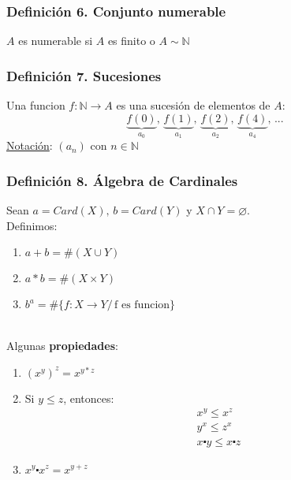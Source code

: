 \documentclass{article}
\newcommand{\comma}{,\,}                                %
\newcommand{\tq}{/\,}                                   %
\newcommand{\naturales}{\mathbb{N}}                     %
\begin{document}
\subsubsection*{Definición 6. Conjunto numerable}
$A$ es numerable si $A$ es finito o $A \sim \naturales$

\subsubsection*{Definición 7. Sucesiones}
Una funcion $f: \naturales \rightarrow A $ es una sucesión de elementos de $A$:
\begin{equation*}
    \underbrace{f(0)}_{a_0}\comma \underbrace{f(1)}_{a_1}\comma \underbrace{f(2)}_{a_2}\comma \underbrace{f(4)}_{a_4}\comma ... 
\end{equation*}
\underline{Notación}: $(a_n)$ con $n \in \naturales$

\subsubsection*{Definición 8. Álgebra de Cardinales}
Sean $a=Card(X)\comma b=Card(Y)$ y $X \cap Y = \varnothing$.
\\Definimos:
\begin{enumerate}
    \item $a + b = \#(X \cup Y)$
    \item $a * b = \#(X \times Y)$
    \item $b^a = \#\{f: X \rightarrow Y \tq \text{f es funcion}\}$
\end{enumerate}
\leavevmode\\Algunas \textbf{propiedades}:
\begin{enumerate}
    \item $(x^y)^z = x^{y*z}$
    \item Si $y \leq z$, entonces:
    \begin{align*}
        &x^y \leq x^z \\
        &y^x \leq z^x \\
        &x \centerdot y \leq x \centerdot z
    \end{align*}
    \item $x^y \centerdot x^z = x^{y+z}$
\end{enumerate}
\end{document}
